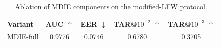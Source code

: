 \begin{table}[t]
\centering
\caption{Ablation of MDIE components on the modified-LFW protocol.}
\label{tab:ablation}
\begin{tabular}{lcccc}
\hline
Variant & AUC $\uparrow$ & EER $\downarrow$ & TAR@$10^{-2}$ $\uparrow$ & TAR@$10^{-3}$ $\uparrow$ \\
\hline
MDIE-full & 0.9776 & 0.0746 & 0.6780 & 0.3705 \\
\hline
\end{tabular}
\end{table}
